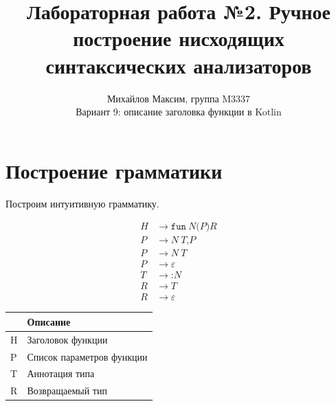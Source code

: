 

\title{Лабораторная работа №2. Ручное построение нисходящих синтаксических анализаторов}
\author{Михайлов Максим, группа M3337 \\ Вариант 9: описание заголовка функции в Kotlin}

\let\endtitlepage\relax



\maketitle
\thispagestyle{empty}

\section{Построение грамматики}

Построим интуитивную грамматику.

\begin{minipage}{.2\textwidth}
    \begin{align*}
        H & \to \texttt{fun}\ N\texttt{(}P\texttt{)}R \\
        P & \to N\ T\texttt{,} P                      \\
        P & \to N\ T                                  \\
        P & \to \varepsilon                           \\
        T & \to {}\texttt{:} N                        \\
        R & \to T                                     \\
        R & \to \varepsilon
    \end{align*}
\end{minipage}
\begin{minipage}{.8\textwidth}
    \begin{center}
        \begin{tabular}{Ll}
            \toprule
             & Описание                  \\ \midrule
            H                 & Заголовок функции         \\
            P                 & Список параметров функции \\
            T                 & Аннотация типа            \\
            R                 & Возвращаемый тип          \\
            \bottomrule
        \end{tabular}
    \end{center}
\end{minipage}


